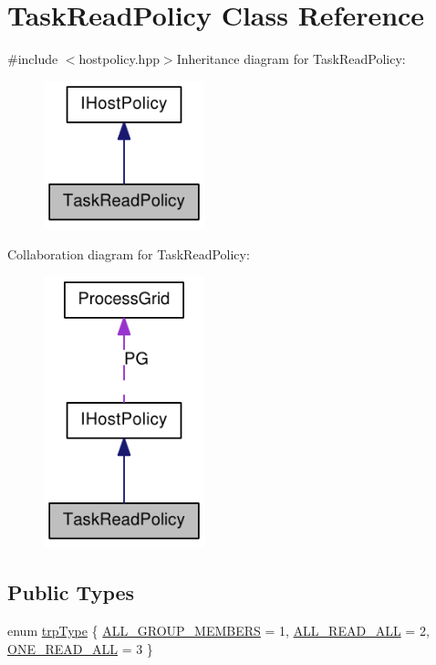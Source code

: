 \hypertarget{class_task_read_policy}{
\section{TaskReadPolicy Class Reference}
\label{class_task_read_policy}
}


{\ttfamily \#include $<$hostpolicy.hpp$>$}Inheritance diagram for TaskReadPolicy:\nopagebreak
\begin{figure}[H]
\begin{center}
\leavevmode
\includegraphics[width=132pt]{class_task_read_policy__inherit__graph}
\end{center}
\end{figure}
Collaboration diagram for TaskReadPolicy:\nopagebreak
\begin{figure}[H]
\begin{center}
\leavevmode
\includegraphics[width=132pt]{class_task_read_policy__coll__graph}
\end{center}
\end{figure}
\subsection*{Public Types}
\begin{DoxyCompactItemize}
\item 
enum \hyperlink{class_task_read_policy_a173796d600a0db7f1a29bdc4a35be2bf}{trpType} \{ \hyperlink{class_task_read_policy_a173796d600a0db7f1a29bdc4a35be2bfa5d75cca618e06eb1359898ceafa315d8}{ALL\_\-GROUP\_\-MEMBERS} = 1, 
\hyperlink{class_task_read_policy_a173796d600a0db7f1a29bdc4a35be2bfa06c6c9be41e59beb7b52e74f898ec0c1}{ALL\_\-READ\_\-ALL} = 2, 
\hyperlink{class_task_read_policy_a173796d600a0db7f1a29bdc4a35be2bfa2c751007f5a7e6d0dceccb94456bd457}{ONE\_\-READ\_\-ALL} = 3
 \}
\end{DoxyCompactItemize}
